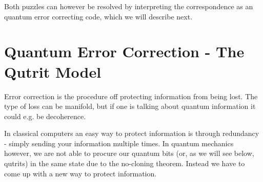 \documentclass[letter,12pt]{article}
\begin{document}
Both puzzles can however be resolved by interpreting the correspondence as an quantum error correcting code, which we will describe next.

\section{Quantum Error Correction - The Qutrit Model}
Error correction is the procedure off protecting information from being lost. The type of loss can be manifold, but if one is talking about quantum information it could e.g. be decoherence. 

In classical computers an easy way to protect information is through redundancy - simply sending your information multiple times. In quantum mechanics however, we are not able to procure our quantum bits (or, as we will see below, qutrits) in the same state due to the no-cloning theorem. Instead we have to come up with a new way to protect information. 
\end{document}
